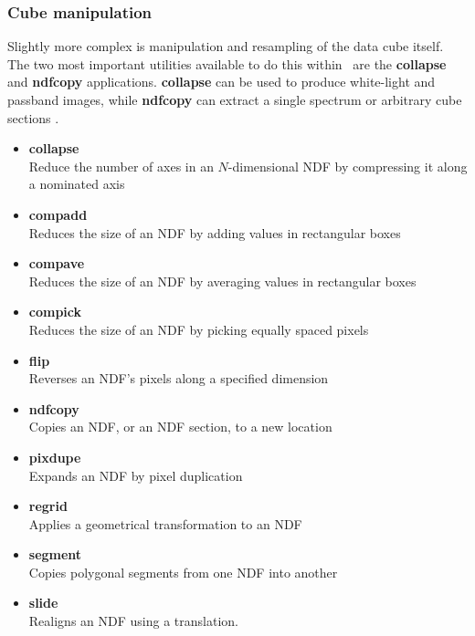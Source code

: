 \documentclass[twoside,11pt]{article}
\newcommand{\htmlref}[2]{#1}
\newcommand{\xref}[3]{#1}
\begin{document}
\begin{\htmlonly}
{\subsubsection{Cube manipulation}

Slightly more complex is manipulation and resampling of the data cube
itself.  The two most important utilities available to do this within
\KAPPA\ are the \xref{{\bf collapse}}{sun95}{COLLAPSE} and
\xref{{\bf ndfcopy}}{sun95}{NDFCOPY} applications.  {\bf collapse} can
be used to produce \htmlref{white-light and passband}{sc16_vis} images, while {\bf ndfcopy} can extract a single spectrum or 
\htmlref{arbitrary cube sections}{sc16_vis} .

\begin{itemize}
\item{\xref{{\bf collapse}}{sun95}{COLLAPSE}}\\
Reduce the number of axes in an $N$-dimensional NDF by compressing it along a nominated axis 
\item{\xref{{\bf compadd}}{sun95}{COMPADD}}\\
Reduces the size of an NDF by adding values in rectangular boxes 
\item{\xref{{\bf compave}}{sun95}{COMPAVE}}\\
Reduces the size of an NDF by averaging values in rectangular boxes 
\item{\xref{{\bf compick}}{sun95}{COMPICK}}\\
Reduces the size of an NDF by picking equally spaced pixels 
\item{\xref{{\bf flip}}{sun95}{FLIP}}\\
Reverses an NDF's pixels along a specified dimension 
\item{\xref{{\bf ndfcopy}}{sun95}{NDFCOPY}}\\
Copies an NDF, or an NDF section, to a new location 
\item{\xref{{\bf pixdupe}}{sun95}{PIXDUPE}}\\
Expands an NDF by pixel duplication 
\item{\xref{{\bf regrid}}{sun95}{REGRID}}\\
Applies a geometrical transformation to an NDF
\item{\xref{{\bf segment}}{sun95}{SEGMENT}}\\
Copies polygonal segments from one NDF into another 
\item{\xref{{\bf slide}}{sun95}{SLIDE}}\\
Realigns an NDF using a translation.
\end{itemize}

}
\end{\htmlonly}
\end{document}
